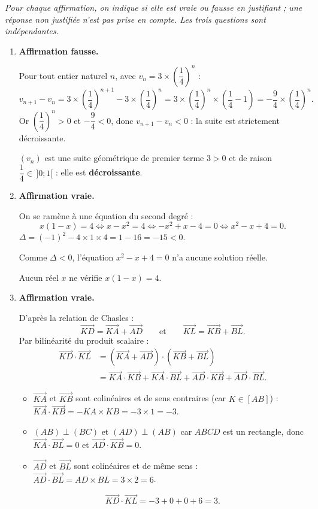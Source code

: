 \emph{Pour chaque affirmation, on indique si elle est vraie ou fausse en justifiant ; une
réponse non justifiée n'est pas prise en compte. Les trois questions sont indépendantes.}

\begin{enumerate}
	\item \textbf{Affirmation fausse.}

	Pour tout entier naturel $n$, avec $v_n = 3 \times \left(\dfrac{1}{4}\right)^n$ :
	\[v_{n+1} - v_n = 3 \times \left(\dfrac{1}{4}\right)^{n+1} - 3 \times \left(\dfrac{1}{4}\right)^n
	= 3 \times \left(\dfrac{1}{4}\right)^n \times \left(\dfrac{1}{4} - 1\right)
	= -\dfrac{9}{4} \times \left(\dfrac{1}{4}\right)^n.\]
	Or $\left(\dfrac{1}{4}\right)^n > 0$ et $-\dfrac{9}{4} < 0$, donc $v_{n+1} - v_n < 0$ : la suite est strictement
	décroissante. 

	$(v_n)$ est une suite géométrique de premier terme $3 > 0$ et de
	raison $\dfrac{1}{4} \in \,]0 ; 1[$ : elle est \textbf{décroissante}.

	\item \textbf{Affirmation vraie.}

	On se ramène à une équation du second degré :
	\[x(1-x) = 4 \iff x - x^2 = 4 \iff -x^2 + x - 4 = 0 \iff x^2 - x + 4 = 0.\]
	$\Delta = (-1)^2 - 4 \times 1 \times 4 = 1 - 16 = -15 < 0$.

	Comme $\Delta < 0$, l'équation $x^2 - x + 4 = 0$ n'a aucune
	solution réelle. 
	
	Aucun réel $x$ ne vérifie $x(1-x) = 4$.

	\item \textbf{Affirmation vraie.}

	
D'après la relation de Chasles :
\[
\overrightarrow{KD}=\overrightarrow{KA}+\overrightarrow{AD}
\qquad\text{et}\qquad
\overrightarrow{KL}=\overrightarrow{KB}+\overrightarrow{BL}.
\]
Par bilinéarité du produit scalaire :
\begin{align*}
\overrightarrow{KD}\cdot\overrightarrow{KL}
&=\left(\overrightarrow{KA}+\overrightarrow{AD}\right)\cdot\left(\overrightarrow{KB}+\overrightarrow{BL}\right)\\
&=\overrightarrow{KA}\cdot\overrightarrow{KB}
+\overrightarrow{KA}\cdot\overrightarrow{BL}
+\overrightarrow{AD}\cdot\overrightarrow{KB}
+\overrightarrow{AD}\cdot\overrightarrow{BL}.
\end{align*}


\begin{itemize}
  \item $\overrightarrow{KA}$ et $\overrightarrow{KB}$ sont colinéaires et de sens contraires (car $K\in[AB]$) :
        $\overrightarrow{KA}\cdot\overrightarrow{KB}=-KA\times KB=-3\times 1=-3$.
  \item $(AB)\perp(BC)$ et $(AD)\perp(AB)$ car $ABCD$ est un rectangle, donc
        $\overrightarrow{KA}\cdot\overrightarrow{BL}=0$ et $\overrightarrow{AD}\cdot\overrightarrow{KB}=0$.
  \item $\overrightarrow{AD}$ et $\overrightarrow{BL}$ sont colinéaires et de même sens :
        $\overrightarrow{AD}\cdot\overrightarrow{BL}=AD\times BL=3\times 2=6$.
\end{itemize}


\[
\overrightarrow{KD}\cdot\overrightarrow{KL}=-3+0+0+6=3.
\]
\end{enumerate}
